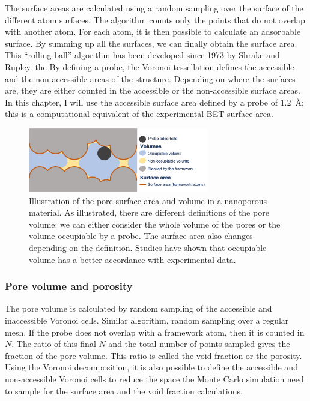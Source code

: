 \documentclass[main.tex]{subfiles}
\begin{document}
The surface areas are calculated using a random sampling over the surface of the different atom surfaces. The algorithm counts only the points that do not overlap with another atom. For each atom, it is then possible to calculate an adsorbable surface. By summing up all the surfaces, we can finally obtain the surface area. This ``rolling ball'' algorithm has been developed since 1973 by Shrake and Rupley.\autocite{Shrake1973} the By defining a probe, the Voronoi tessellation defines the accessible and the non-accessible areas of the structure. Depending on where the surfaces are, they are either counted in the accessible or the non-accessible surface areas. In this chapter, I will use the accessible surface area defined by a probe of $1.2$~\si{\angstrom}; this is a computational equivalent of the experimental  BET surface area.

\begin{figure}[ht!]
  \centering
  \includegraphics[width=0.7\textwidth]{figures/1-screening/Pore_descriptors.jpg}
  \caption{Illustration of the pore surface area and volume in a nanoporous material. As illustrated, there are different definitions of the pore volume: we can either consider the whole volume of the pores or the volume occupiable by a probe. The surface area also changes depending on the definition. Studies have shown that occupiable volume has a better accordance with experimental data.\autocite{vol_Ongari2017}}\label{fgr:pores}
\end{figure}

\subsubsection{Pore volume and porosity}

The pore volume is calculated by random sampling of the accessible and inaccessible Voronoi cells. Similar algorithm, random sampling over a regular mesh. If the probe does not overlap with a framework atom, then it is counted in $N$. The ratio of this final $N$ and the total number of points sampled gives the fraction of the pore volume. This ratio is called the void fraction or the porosity. Using the Voronoi decomposition, it is also possible to define the accessible and non-accessible Voronoi cells to reduce the space the Monte Carlo simulation need to sample for the surface area and the void fraction calculations.
\end{document}
